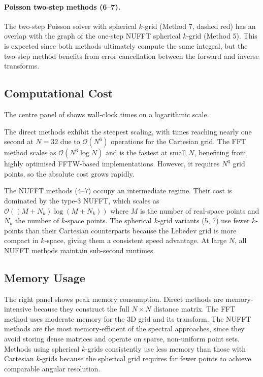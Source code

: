 \documentclass[12pt,a4paper]{article}
\begin{document}
\paragraph{Poisson two-step methods (6--7).} The two-step Poisson solver with spherical $k$-grid (Method 7, dashed red) has an overlap with the graph of the one-step NUFFT spherical $k$-grid (Method 5). This is expected since both methods ultimately compute the same integral, but the two-step method benefits from error cancellation between the forward and inverse transforms.

\subsection{Computational Cost}

The centre panel of  shows wall-clock times on a logarithmic scale.

The direct methods exhibit the steepest scaling, with times reaching nearly one second at $N = 32$ due to $\mathcal{O}(N^6)$ operations for the Cartesian grid. The FFT method scales as $\mathcal{O}(N^3 \log N)$ and is the fastest at small $N$, benefiting from highly optimised FFTW-based implementations. However, it requires $N^3$ grid points, so the absolute cost grows rapidly.

The NUFFT methods (4--7) occupy an intermediate regime. Their cost is dominated by the type-3 NUFFT, which scales as $\mathcal{O}((M + N_k)\log(M + N_k))$ where $M$ is the number of real-space points and $N_k$ the number of $k$-space points. The spherical $k$-grid variants (5, 7) use fewer $k$-points than their Cartesian counterparts because the Lebedev grid is more compact in $k$-space, giving them a consistent speed advantage. At large $N$, all NUFFT methods maintain sub-second runtimes.

\subsection{Memory Usage}

The right panel shows peak memory consumption. Direct methods are memory-intensive because they construct the full $N \times N$ distance matrix. The FFT method uses moderate memory for the 3D grid and its transform. The NUFFT methods are the most memory-efficient of the spectral approaches, since they avoid storing dense matrices and operate on sparse, non-uniform point sets. Methods using spherical $k$-grids consistently use less memory than those with Cartesian $k$-grids because the spherical grid requires far fewer points to achieve comparable angular resolution.
\end{document}
